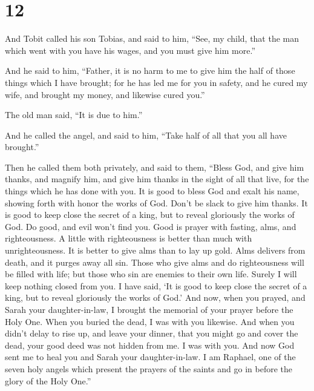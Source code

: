 \hypertarget{section-11}{%
\section{12}\label{section-11}}

 And Tobit called his son Tobias, and said to him, ``See,
my child, that the man which went with you have his wages, and you must
give him more.''

 And he said to him, ``Father, it is no harm to me to give
him the half of those things which I have brought;  for he
has led me for you in safety, and he cured my wife, and brought my
money, and likewise cured you.''

 The old man said, ``It is due to him.''

 And he called the angel, and said to him, ``Take half of
all that you all have brought.''

 Then he called them both privately, and said to them,
``Bless God, and give him thanks, and magnify him, and give him thanks
in the sight of all that live, for the things which he has done with
you. It is good to bless God and exalt his name, showing forth with
honor the works of God. Don't be slack to give him thanks.
 It is good to keep close the secret of a king, but to
reveal gloriously the works of God. Do good, and evil won't find you.
 Good is prayer with fasting, alms, and righteousness. A
little with righteousness is better than much with unrighteousness. It
is better to give alms than to lay up gold.  Alms delivers
from death, and it purges away all sin. Those who give alms and do
righteousness will be filled with life;  but those who
sin are enemies to their own life.  Surely I will keep
nothing closed from you. I have said, `It is good to keep close the
secret of a king, but to reveal gloriously the works of God.'
 And now, when you prayed, and Sarah your
daughter-in-law, I brought the memorial of your prayer before the Holy
One. When you buried the dead, I was with you likewise. 
And when you didn't delay to rise up, and leave your dinner, that you
might go and cover the dead, your good deed was not hidden from me. I
was with you.  And now God sent me to heal you and Sarah
your daughter-in-law.  I am Raphael, one of the seven
holy angels which present the prayers of the saints and go in before the
glory of the Holy One.''

